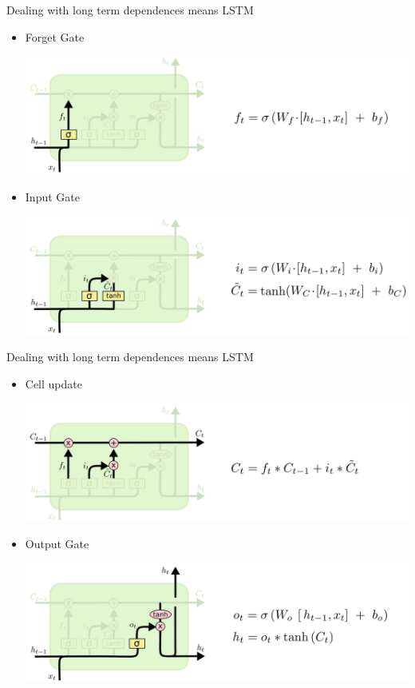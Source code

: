 \documentclass{beamer}
\begin{document}
\begin{frame}{Dealing with long term dependences means LSTM}
	\begin{itemize}
		 \item Forget Gate  
			\begin{center}
				 \includegraphics[scale=0.4]{./img/lstm_fog}
			\end{center}
		 \item Input Gate
			\begin{center}
				 \includegraphics[scale=0.4]{./img/lstm_in}
			\end{center}
	\end{itemize}
\end{frame}

\begin{frame}{Dealing with long term dependences means LSTM}
		\begin{itemize}
			 \item Cell update 
			\begin{center}
				 \includegraphics[scale=0.4]{./img/lstm_cell}
			\end{center}
			 \item Output Gate
			\begin{center}
				 \includegraphics[scale=0.4]{./img/lstm_out}
			\end{center}
		\end{itemize}
\end{frame}
\end{document}
